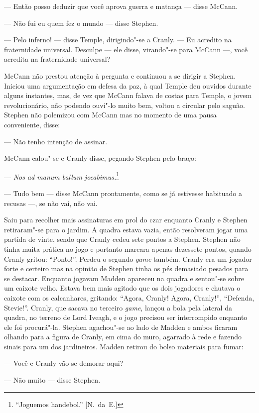 --- Então posso deduzir que você aprova guerra e matança --- disse McCann.

--- Não fui eu quem fez o mundo --- disse Stephen.

--- Pelo inferno! --- disse Temple, dirigindo"-se a Cranly.  --- Eu acredito na
fraternidade universal.  Desculpe --- ele disse, virando"-se para McCann ---,
você acredita na fraternidade universal?

McCann não prestou atenção à pergunta e continuou a se dirigir a Stephen.
Iniciou uma argumentação em defesa da paz, à qual Temple deu ouvidos durante
alguns instantes, mas, de vez que McCann falava de costas para Temple, o jovem
revolucionário, não podendo ouvi"-lo muito bem, voltou a circular pelo saguão.
Stephen não polemizou com McCann mas no momento de uma pausa conveniente,
disse:

--- Não tenho intenção de assinar.

McCann calou"-se e Cranly disse, pegando Stephen pelo braço:

--- \textit{Nos ad manum ballum jocabimus.}\footnote{ ``Joguemos handebol.'' [N.~da~E.]} 

--- Tudo bem --- disse McCann prontamente, como se já estivesse habituado a
recusas ---, se não vai, não vai.

Saiu para recolher mais assinaturas em prol do czar enquanto Cranly e Stephen
retiraram"-se para o jardim.  A quadra estava vazia, então resolveram jogar uma
partida de vinte, sendo que Cranly cedeu sete pontos a Stephen.  Stephen não
tinha muita prática no jogo e portanto marcara apenas dezessete pontos, quando
Cranly gritou: “Ponto!”.  Perdeu o segundo \textit{game} também.  Cranly era um
jogador forte e certeiro mas na opinião de Stephen tinha os pés demasiado
pesados para se destacar.  Enquanto jogavam Madden apareceu na quadra e
sentou"-se sobre um caixote velho.  Estava bem mais agitado que os dois
jogadores e chutava o caixote com os calcanhares, gritando: “Agora, Cranly!
Agora, Cranly!”, “Defenda, Stevie!”.  Cranly, que sacava no terceiro
\textit{game}, lançou a bola pela lateral da quadra, no terreno de Lord Iveagh,
e o jogo precisou ser interrompido enquanto ele foi procurá"-la.  Stephen
agachou"-se ao lado de Madden e ambos ficaram olhando para a figura de Cranly,
em cima do muro, agarrado à rede e fazendo sinais para um dos jardineiros.
Madden retirou do bolso materiais para fumar:

--- Você e Cranly vão se demorar aqui?

--- Não muito --- disse Stephen.

